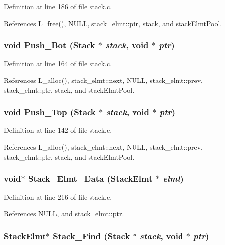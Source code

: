 Definition at line 186 of file stack.c.

References L\_\-free(), NULL, stack\_\-elmt::ptr, stack, and stack\-Elmt\-Pool.
\subsubsection{\setlength{\rightskip}{0pt plus 5cm}void Push\_\-Bot (\bf{Stack} $\ast$ {\em stack}, void $\ast$ {\em ptr})}\label{stack_8c_c8216bbaefe6187f1c0e30e598ecb087}




Definition at line 164 of file stack.c.

References L\_\-alloc(), stack\_\-elmt::next, NULL, stack\_\-elmt::prev, stack\_\-elmt::ptr, stack, and stack\-Elmt\-Pool.
\subsubsection{\setlength{\rightskip}{0pt plus 5cm}void Push\_\-Top (\bf{Stack} $\ast$ {\em stack}, void $\ast$ {\em ptr})}\label{stack_8c_1460a4e9e492df3a1a002611c747380d}




Definition at line 142 of file stack.c.

References L\_\-alloc(), stack\_\-elmt::next, NULL, stack\_\-elmt::prev, stack\_\-elmt::ptr, stack, and stack\-Elmt\-Pool.
\subsubsection{\setlength{\rightskip}{0pt plus 5cm}void$\ast$ Stack\_\-Elmt\_\-Data (\bf{Stack\-Elmt} $\ast$ {\em elmt})}\label{stack_8c_0eff362c9d73742195bcd69648d3db91}




Definition at line 216 of file stack.c.

References NULL, and stack\_\-elmt::ptr.
\subsubsection{\setlength{\rightskip}{0pt plus 5cm}\bf{Stack\-Elmt}$\ast$ Stack\_\-Find (\bf{Stack} $\ast$ {\em stack}, void $\ast$ {\em ptr})}\label{stack_8c_417303f375efe00595817d5baebb7ffa}




